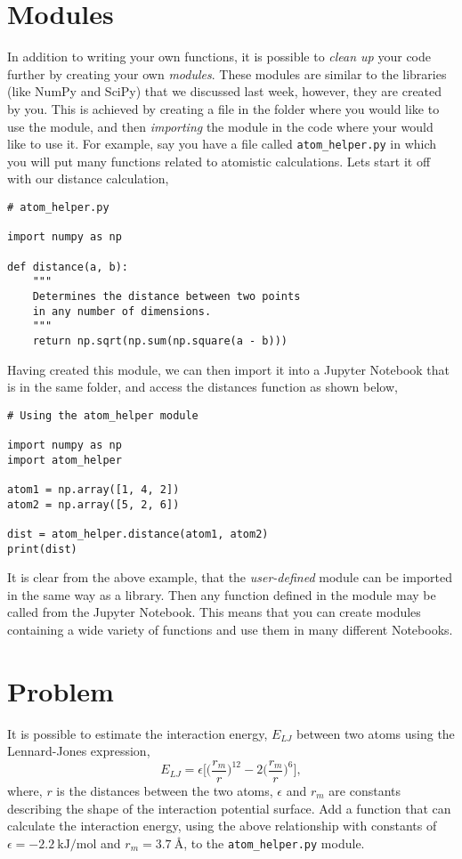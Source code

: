 \documentclass[a4paper]{article}
\begin{document}
\section{Modules}

In addition to writing your own functions, it is possible to \emph{clean up} your code further by creating your own \emph{modules}.
These modules are similar to the libraries (like NumPy and SciPy) that we discussed last week, however, they are created by you.
This is achieved by creating a file in the folder where you would like to use the module, and then \emph{importing} the module in the code where your would like to use it.
For example, say you have a file called \texttt{atom\_helper.py} in which you will put many functions related to atomistic calculations.
Lets start it off with our distance calculation,
\begin{lstlisting}
# atom_helper.py

import numpy as np

def distance(a, b):
    """
    Determines the distance between two points
    in any number of dimensions.
    """
    return np.sqrt(np.sum(np.square(a - b)))
\end{lstlisting}
Having created this module, we can then import it into a Jupyter Notebook that is in the same folder, and access the distances function as shown below,
\begin{lstlisting}
# Using the atom_helper module

import numpy as np
import atom_helper

atom1 = np.array([1, 4, 2])
atom2 = np.array([5, 2, 6])

dist = atom_helper.distance(atom1, atom2)
print(dist)
\end{lstlisting}
It is clear from the above example, that the \emph{user-defined} module can be imported in the same way as a library.
Then any function defined in the module may be called from the Jupyter Notebook.
This means that you can create modules containing a wide variety of functions and use them in many different Notebooks.

\section{Problem}

It is possible to estimate the interaction energy, $E_{LJ}$ between two atoms using the Lennard-Jones expression,
\begin{equation}
  E_{LJ} = \epsilon \bigg[\Big(\frac{r_m}{r}\Big)^{12} - 2\Big(\frac{r_m}{r}\Big)^6\bigg],
\end{equation}
where, $r$ is the distances between the two atoms, $\epsilon$ and $r_m$ are constants describing the shape of the interaction potential surface.
Add a function that can calculate the interaction energy, using the above relationship with constants of $\epsilon = \SI{-2.2}{\kilo\joule\per\mol}$ and $r_m = \SI{3.7}{\angstrom}$, to the \texttt{atom\_helper.py} module.
\end{document}

